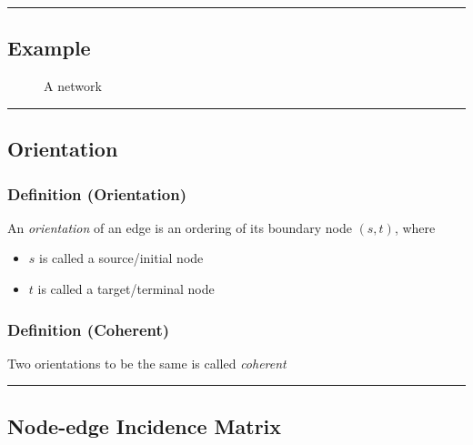 \documentclass[
]{article}
\providecommand{\tightlist}{%
  \setlength{\itemsep}{0pt}\setlength{\parskip}{0pt}}
\begin{document}
\begin{center}\rule{0.5\linewidth}{0.5pt}\end{center}

\subsection{Example}\label{example}

\begin{figure}[hp]
\centering

\caption{A network}%
\label{fig:network}
\end{figure}

\begin{center}\rule{0.5\linewidth}{0.5pt}\end{center}

\subsection{Orientation}\label{orientation}

\subsubsection{Definition (Orientation)}\label{definition-orientation}

An \emph{orientation} of an edge is an ordering of its boundary node
\((s, t)\), where

\begin{itemize}
\tightlist
\item
  \(s\) is called a source/initial node
\item
  \(t\) is called a target/terminal node
\end{itemize}

\subsubsection{Definition (Coherent)}\label{definition-coherent}

Two orientations to be the same is called \emph{coherent}

\begin{center}\rule{0.5\linewidth}{0.5pt}\end{center}

\subsection{Node-edge Incidence Matrix}\label{node-edge-incidence-matrix}
\end{document}
